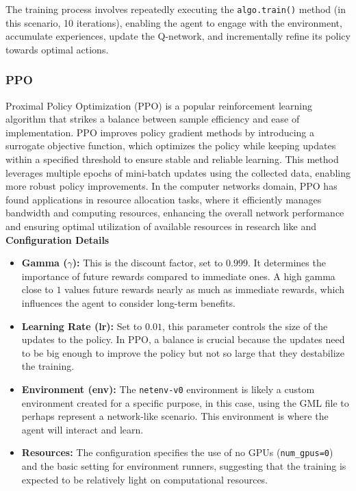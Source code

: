 \documentclass[conference]{IEEEtran}
\begin{document}
The training process involves repeatedly executing the \texttt{algo.train()} method (in this scenario, 10 iterations), enabling the agent to engage with the environment, accumulate experiences, update the Q-network, and incrementally refine its policy towards optimal actions.
\newline


\subsubsection{PPO}
Proximal Policy Optimization (PPO) is a popular reinforcement learning algorithm that strikes a balance between sample efficiency and ease of implementation. PPO improves policy gradient methods by introducing a surrogate objective function, which optimizes the policy while keeping updates within a specified threshold to ensure stable and reliable learning. This method leverages multiple epochs of mini-batch updates using the collected data, enabling more robust policy improvements. In the computer networks domain, PPO has found applications in resource allocation tasks, where it efficiently manages bandwidth and computing resources, enhancing the overall network performance and ensuring optimal utilization of available resources in research like \cite{ppo1} and \cite{ppo2}
\\\newline
\textbf{Configuration Details}

\begin{itemize}
    \item \textbf{Gamma ($\gamma$):} This is the discount factor, set to $0.999$. It determines the importance of future rewards compared to immediate ones. A high gamma close to $1$ values future rewards nearly as much as immediate rewards, which influences the agent to consider long-term benefits.
    
    \item \textbf{Learning Rate (lr):} Set to $0.01$, this parameter controls the size of the updates to the policy. In PPO, a balance is crucial because the updates need to be big enough to improve the policy but not so large that they destabilize the training.
    
    \item \textbf{Environment (env):} The \texttt{netenv-v0} environment is likely a custom environment created for a specific purpose, in this case, using the GML file to perhaps represent a network-like scenario. This environment is where the agent will interact and learn.
    
    \item \textbf{Resources:} The configuration specifies the use of no GPUs (\texttt{num\_gpus=0}) and the basic setting for environment runners, suggesting that the training is expected to be relatively light on computational resources.
\end{itemize}
\end{document}
